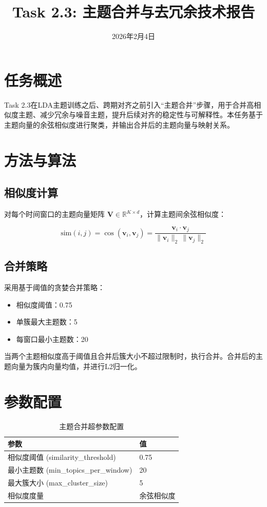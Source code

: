 \documentclass[11pt,a4paper]{article}
\title{\textbf{Task 2.3: 主题合并与去冗余技术报告}}
\date{2026年2月4日}
\begin{document}
\maketitle

\section{任务概述}

Task 2.3在LDA主题训练之后、跨期对齐之前引入“主题合并”步骤，用于合并高相似度主题、减少冗余与噪音主题，提升后续对齐的稳定性与可解释性。本任务基于主题向量的余弦相似度进行聚类，并输出合并后的主题向量与映射关系。

\section{方法与算法}

\subsection{相似度计算}

对每个时间窗口的主题向量矩阵 $\mathbf{V}\in\mathbb{R}^{K\times d}$，计算主题间余弦相似度：

\begin{equation}
\text{sim}(i,j)=\cos(\mathbf{v}_i,\mathbf{v}_j)=\frac{\mathbf{v}_i\cdot\mathbf{v}_j}{\|\mathbf{v}_i\|_2\,\|\mathbf{v}_j\|_2}
\end{equation}

\subsection{合并策略}

采用基于阈值的贪婪合并策略：
\begin{itemize}
    \item 相似度阈值：0.75
    \item 单簇最大主题数：5
    \item 每窗口最小主题数：20
\end{itemize}

当两个主题相似度高于阈值且合并后簇大小不超过限制时，执行合并。合并后的主题向量为簇内向量均值，并进行L2归一化。

\section{参数配置}

\begin{table}[h]
\centering
\begin{tabular}{ll}
\toprule
\textbf{参数} & \textbf{值} \\
\midrule
相似度阈值 (similarity\_threshold) & 0.75 \\
最小主题数 (min\_topics\_per\_window) & 20 \\
最大簇大小 (max\_cluster\_size) & 5 \\
相似度度量 & 余弦相似度 \\
\bottomrule
\end{tabular}
\caption{主题合并超参数配置}
\end{table}
\end{document}
